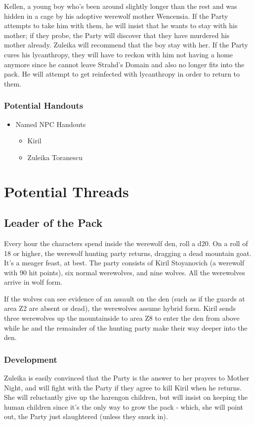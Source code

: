 \documentclass[a4paper,11pt]{article}
\begin{document}
Kellen, a young boy who's been around slightly longer than the rest and was hidden in a cage by his adoptive 
werewolf mother Wencensia. If the Party attempts to take him with them, he will insist that he wants to stay with 
his mother; if they probe, the Party will discover that they have murdered his mother already. Zuleika will 
recommend that the boy stay with her. If the Party cures his lycanthropy, they will have to reckon with him not 
having a home anymore since he cannot leave Strahd's Domain and also no longer fits into the pack. He will attempt 
to get reinfected with lycanthropy in order to return to them.
\subsubsection{Potential Handouts}
\begin{itemize}
  \item Named NPC Handouts
  \begin{itemize}
    \item Kiril
    \item Zuleika Toranescu
  \end{itemize}
\end{itemize}

\section{Potential Threads}
\label{sec:PotentialThreads}
\subsection{Leader of the Pack}
Every hour the characters spend inside the werewolf den, roll a d20. On a roll of 18 or higher, the werewolf 
hunting party returns, dragging a dead mountain goat. It's a meager feast, at best. The party consists of Kiril 
Stoyanovich (a werewolf with 90 hit points), six normal werewolves, and nine wolves. All the werewolves arrive in 
wolf form.

If the wolves can see evidence of an assault on the den (such as if the guards at area Z2 are absent or dead), the 
werewolves assume hybrid form. Kiril sends three werewolves up the mountainside to area Z8 to enter the den from 
above while he and the remainder of the hunting party make their way deeper into the den.

\subsubsection{Development}
Zuleika is easily convinced that the Party is the answer to her prayers to Mother Night, and will fight with the
Party if they agree to kill Kiril when he returns. She will reluctantly give up the harengon children, but will 
insist on keeping the human children since it's the only way to grow the pack - which, she will point out, the 
Party just slaughtered (unless they snuck in).
\end{document}
